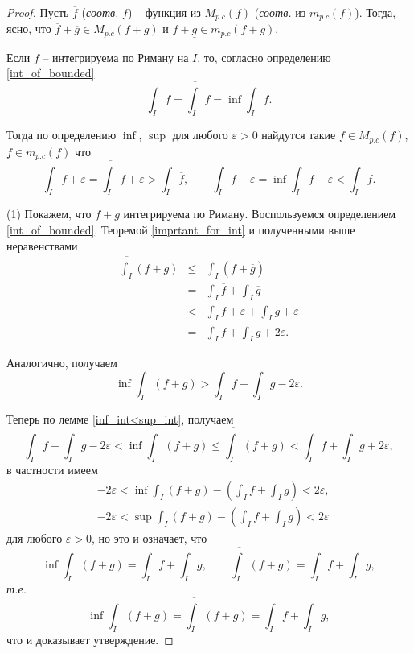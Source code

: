 \begin{proof}

Пусть $\overline{f}$ (\textit{соотв.} $\underline{f}$) -- функция из $M_{p.c}(f)$ (\textit{соотв.} из $m_{p.c}(f)$). Тогда, ясно, что $\overline{f}+\overline{g} \in M_{p.c}(f+g)$ и $\underline{f}+ \underline{g} \in m_{p.c}(f+g).$

Если $f$ -- интегрируема по Риману на $I$, то, согласно определению \ref{int_of_bounded}
\[
 \int_I f = \overline{\int_I} f = \inf \int_I f.
\]

Тогда по определению $\inf$, $\sup$ для любого $\varepsilon >0$ найдутся такие $\overline{f} \in M_{p.c}(f)$, $\underline{f} \in m_{p.c}(f)$ что
\begin{equation}\label{non_for_Th}
  \int_I f + \varepsilon = \overline{\int_I} f+ \varepsilon > \int_I \overline{f}, \qquad \int_I f - \varepsilon = \inf \int_I f - \varepsilon < \int_I \underline{f}.    
\end{equation}


(1) Покажем, что $f+g$ интегрируема по Риману. Воспользуемся определением \ref{int_of_bounded}, Теоремой \ref{imprtant_for_int} и полученными выше неравенствами
\begin{eqnarray*}
    \overline{\int_I} (f+g) &\le& \int_I (\overline{f}+\overline{g}) \\
    &=& \int_I \overline{f} + \int_I \overline{g} \\
    &< & \int_I f + \varepsilon + \int_I g + \varepsilon \\
    &=& \int_I f + \int_I g + 2 \varepsilon.
\end{eqnarray*}

Аналогично, получаем
\[
 \inf \int_I(f+g) > \int_If + \int_I g - 2\varepsilon.
\]

Теперь по лемме \ref{inf_int<sup_int}, получаем
\[
 \int_If + \int_I g - 2\varepsilon < \inf \int_I(f+g) \le \overline{\int_I} (f+g) < \int_I f + \int_I g + 2 \varepsilon,
\]
в частности имеем
\begin{align*}
    & -2\varepsilon < \inf\int_I(f+g) - \left( \int_I f + \int_I g \right)<2\varepsilon,\\
    & -2\varepsilon < \sup\int_I(f+g) - \left( \int_I f + \int_I g \right)<2\varepsilon
\end{align*}
для любого $\varepsilon>0$, но это и означает, что
\[
 \inf \int_I(f+g) = \int_I f + \int_I g, \qquad \overline{\int_I} (f+g) = \int_If + \int_I g,
\]
\textit{т.е.}
\[
 \inf \int_I(f+g) = \overline{\int_I} (f+g) = \int_If + \int_I g,
\]
что и доказывает утверждение.


\end{proof}
